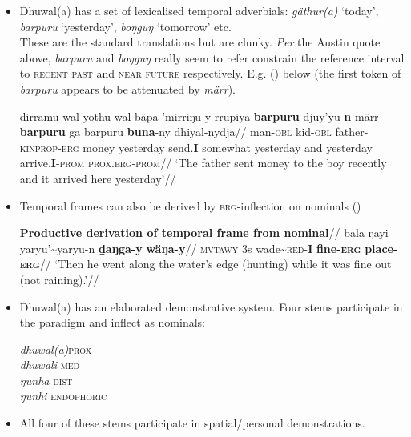 \documentclass[11pt]{article}
\newcommand{\gls}{\textsc}
\begin{document}
\begin{itemize}
	\item Dhuwal(a) has a set of lexicalised temporal adverbials: \textit{gäthur(a)} `today', \textit{barpuru} `yesterday', \textit{boŋguŋ} `tomorrow' etc.\\
	These are the standard translations but are clunky. \textit{Per} the Austin quote above, \textit{barpuru} and \textit{boŋguŋ} really seem to refer constrain the reference interval to \textsc{recent past} and \textsc{near future} respectively. E.g. (\nextx) below (the first token of \textit{barpuru} appears to be attenuated by \textit{märr}).
	
	\pex\begingl\gla ḏirramu-wal yothu-wal bäpa-'mirriŋu-y rrupiya \textbf{barpuru} djuy'yu-\textbf{n} märr \textbf{barpuru} ga barpuru \textbf{buna}-ny dhiyal-nydja//
	\glb man-\gls{obl} kid-\gls{obl} father-\gls{kinprop}-\textsc{erg} money yesterday send.\textbf{I} somewhat yesterday and yesterday arrive.\textbf{I}-\textsc{prom} \gls{prox}.\gls{erg}-\gls{prom}//
	\glft`The father sent money to the boy recently and it arrived here yesterday'//\endgl
	\xe
	
	
	\item Temporal frames can also be derived by \textsc{erg}-inflection on nominals (\nextx)
	
	\pex{}\begingl\glpreamble\textbf{Productive derivation of temporal frame from nominal}//
	\gla bala ŋayi yaryu'\textasciitilde{yaryu}-n \textbf{ḏaŋga-y} \textbf{wäŋa-y}//
	\glb \textsc{mvtawy} 3s wade\textasciitilde{\textsc{red}}-\textbf{I} \textbf{fine-\textsc{erg}} \textbf{place-\textsc{erg}}//
	\glft`Then he went along the water's edge (hunting) while it was fine out (not raining).'//\endgl\xe
	
	
	\item Dhuwal(a) has an elaborated demonstrative system. Four stems participate in the paradigm and inflect as nominals:
\begin{tabbing}
\textit{dhuwal(a)}\quad \=  \textsc{prox}\\
\textit{dhuwali}  \> \textsc{med}\\
\textit{ŋunha} \> \textsc{dist}\\
\textit{ŋunhi} \> \textsc{endophoric}
\end{tabbing}

\item All four of these stems participate in spatial/personal demonstrations.


\end{itemize}
\end{document}
